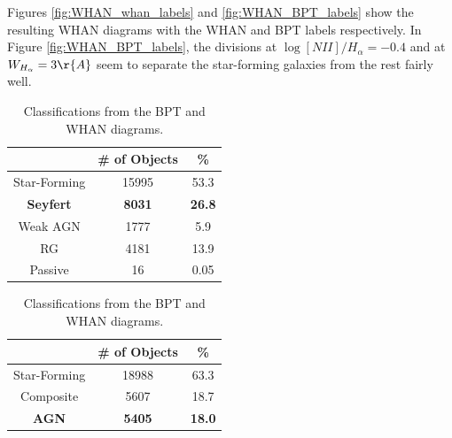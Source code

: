 \documentclass[letterpaper, oneside]{article}
\begin{document}
	Figures \ref{fig:WHAN_whan_labels} and \ref{fig:WHAN_BPT_labels} show the resulting WHAN diagrams with the WHAN and BPT labels respectively. In Figure \ref{fig:WHAN_BPT_labels}, the divisions at $\log{[NII] / H_\alpha} = -0.4$ and at $W_{H_\alpha} = 3 \r{A}$ seem to separate the star-forming galaxies from the rest fairly well.
	
		\begin{table}[H]
		\begin{subtable}[h]{0.45\textwidth}
			\centering
			\begin{tabular}{ccc}
				\hline \hline
				& \# of Objects & \% \\ \hline
				Star-Forming 		& 15995         & 53.3             \\
				\textbf{Seyfert}    & \textbf{8031}          & \textbf{26.8}             \\
				Weak AGN     		& 1777          & 5.9              \\
				RG           		& 4181          & 13.9             \\
				Passive     & 16            & 0.05             \\ \hline
			\end{tabular}
			\caption{Classification from the WHAN diagram.}
			\label{tab:whan_labels}
		\end{subtable}
		\hfill
		\begin{subtable}[h]{0.45\textwidth}
			\centering
			\begin{tabular}{ccc}
				\hline \hline
				& \# of Objects & \% \\ \hline
				Star-Forming 		  & 18988         & 63.3             \\
				Composite   		  & 5607          & 18.7             \\
				\textbf{AGN}          & \textbf{5405}          & \textbf{18.0}             \\ \hline
			\end{tabular}
			\caption{Classification from the BPT diagram.}
			\label{tab:bpt_labels}
		\end{subtable}
		\caption{Classifications from the BPT and WHAN diagrams.}
		\label{tab:whan_vs_bpt_labels}
	\end{table}
	
\end{document}
